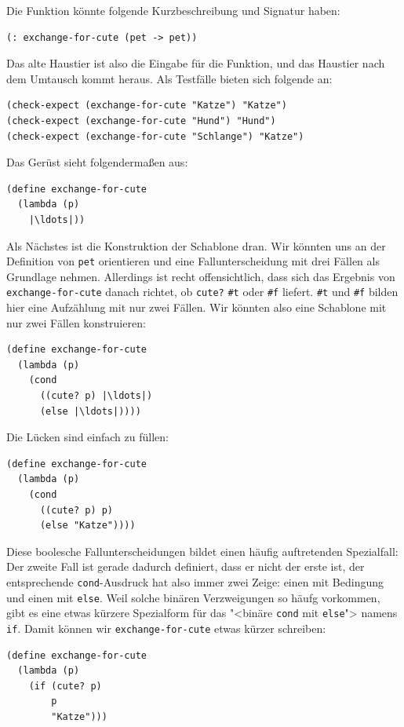 Die Funktion könnte folgende Kurzbeschreibung und Signatur
haben:
%
\begin{lstlisting}
(: exchange-for-cute (pet -> pet))
\end{lstlisting}
%
Das alte Haustier ist also die Eingabe für die Funktion, und das
Haustier nach dem Umtausch kommt heraus.  Als Testfälle bieten sich
folgende an:
%
\begin{lstlisting}
(check-expect (exchange-for-cute "Katze") "Katze")
(check-expect (exchange-for-cute "Hund") "Hund")
(check-expect (exchange-for-cute "Schlange") "Katze")
\end{lstlisting}
%
Das Gerüst sieht folgendermaßen aus:
%
\begin{lstlisting}
(define exchange-for-cute
  (lambda (p)
    |\ldots|))
\end{lstlisting}
%
Als Nächstes ist die Konstruktion der Schablone dran.  Wir könnten uns
an der Definition von \lstinline{pet} orientieren und eine
Fallunterscheidung mit drei Fällen als Grundlage nehmen.  Allerdings
ist recht offensichtlich, dass sich das Ergebnis von
\lstinline{exchange-for-cute} danach richtet, ob \lstinline{cute?} \lstinline{#t}
oder \lstinline{#f} liefert.   \lstinline{#t} und \lstinline{#f} bilden hier eine
Aufzählung mit nur zwei Fällen.  Wir könnten also eine Schablone mit
nur zwei Fällen konstruieren:
%
\begin{lstlisting}
(define exchange-for-cute
  (lambda (p)
    (cond
      ((cute? p) |\ldots|)
      (else |\ldots|))))
\end{lstlisting}
%
Die Lücken sind einfach zu füllen:
%
\begin{lstlisting}
(define exchange-for-cute
  (lambda (p)
    (cond
      ((cute? p) p)
      (else "Katze"))))
\end{lstlisting}
%
Diese boolesche Fallunterscheidungen bildet einen häufig auftretenden
Spezialfall: Der zweite Fall ist gerade dadurch definiert, dass er
nicht der erste ist, der entsprechende \lstinline{cond}-Ausdruck hat also
immer zwei Zeige: einen mit Bedingung und einen mit \lstinline{else}.
Weil solche binären Verzweigungen so häufg vorkommen, gibt es eine
etwas kürzere Spezialform für das "<binäre \lstinline{cond} mit
\lstinline{else}"> namens \lstinline{if}.  Damit
können wir \lstinline{exchange-for-cute} etwas kürzer schreiben:
%
\begin{lstlisting}
(define exchange-for-cute
  (lambda (p)
    (if (cute? p)
        p
        "Katze")))
\end{lstlisting}
